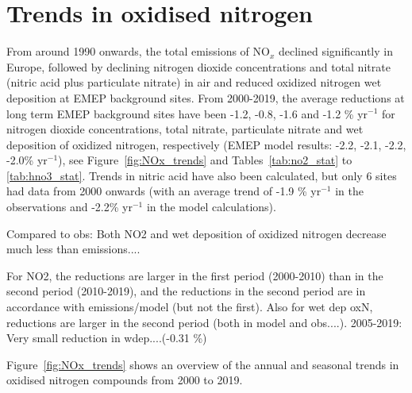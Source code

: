 \section{\label{sec:Trends_oxidised_nitrogen }Trends in oxidised nitrogen}



From around 1990 onwards, the total emissions of NO$_x$ declined significantly in Europe, followed by declining nitrogen dioxide concentrations and total nitrate (nitric acid plus particulate nitrate) in air and reduced oxidized nitrogen wet deposition at EMEP background sites. From 2000-2019, the average reductions at long term EMEP background sites have been -1.2, -0.8, -1.6 and -1.2 \% yr$^{-1}$ for nitrogen dioxide concentrations, total nitrate, particulate nitrate and wet deposition of oxidized nitrogen, respectively (EMEP model results: -2.2, -2.1, -2.2, -2.0\% yr$^{-1}$), see Figure~\ref{fig:NOx_trends} and Tables~\ref{tab:no2_stat} to \ref{tab:hno3_stat}. Trends in nitric acid have also been calculated, but only 6 sites had data from 2000 onwards (with an average trend of -1.9 \% yr$^{-1}$ in the observations and -2.2\% yr$^{-1}$ in the model calculations). 

Compared to obs: Both NO2 and wet deposition of oxidized nitrogen decrease much less than emissions....

For NO2, the reductions are larger in the first period (2000-2010) than in the second period (2010-2019), and the reductions in the second period are in accordance with emissions/model (but not the first). Also for wet dep oxN, reductions are larger in the second period (both in model and obs....). 2005-2019: Very small reduction in wdep....(-0.31 \%)


Figure~\ref{fig:NOx_trends} shows an overview of the annual and seasonal trends in oxidised nitrogen compounds from 2000 to 2019.


